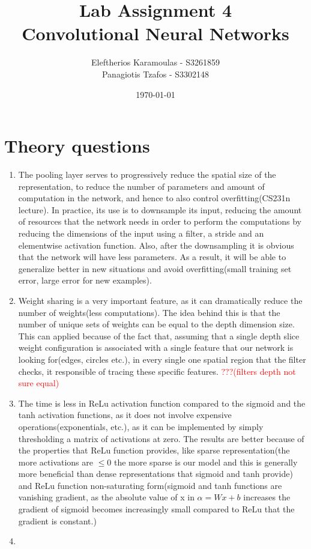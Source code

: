 \documentclass{article}
\title{Lab Assignment 4\\ {\Large Convolutional Neural Networks}}
\date{\today}
\author{
 	Eleftherios Karamoulas - S3261859\\ 
	Panagiotis Tzafos - S3302148\\
}
\begin{document}
\maketitle
\section{Theory questions}
\begin{enumerate}
\item The pooling layer serves to progressively reduce the spatial size of the representation, to reduce the number of parameters and amount of computation in the network, and hence to also control overfitting(CS231n lecture). In practice, its use is to downsample its input, reducing the amount of resources that the network needs in order to perform the computations by reducing the dimensions of the input using a filter, a stride and an elementwise activation function. Also, after the downsampling it is obvious that the network will have less parameters. As a result, it will be able to generalize better in new situations and avoid overfitting(small training set error, large error for new examples). 
\item
Weight sharing is a very important feature, as it can dramatically reduce the number of weights(less computations). The idea behind this is that the number of unique sets of weights can be equal to the depth dimension size. This can applied because of the fact that, assuming that a single depth slice weight configuration is associated with a single feature that our network is looking for(edges, circles etc.), in every single one spatial region that the filter checks, it responsible of tracing these specific features. \textcolor{red}{???(filters depth not sure equal)}
\item
The time is less in ReLu activation function compared to the sigmoid and the tanh activation functions, as it does not involve expensive operations(exponentials, etc.), as it can be implemented by simply thresholding a matrix of activations at zero. The results are better because of the properties that ReLu function provides, like sparse representation(the more activations are \(\le 0 \) the more sparse is our model and this is generally more beneficial than dense representations that sigmoid and tanh provide) and ReLu function non-saturating form(sigmoid and tanh functions are vanishing gradient, as the absolute value of x in \(\alpha = Wx + b \) increases the gradient of sigmoid becomes increasingly small compared to ReLu that the gradient is constant.) 
\item 

\end{enumerate}
\end{document}
